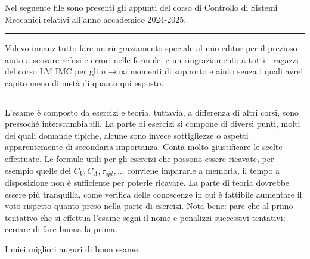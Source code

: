 \intro
Nel seguente file sono presenti gli appunti del corso di Controllo di Sistemi Meccanici relativi all'anno accademico 2024-2025.

\bigskip
\rule{\linewidth}{0.4pt}
\bigskip

Volevo innanzitutto fare un ringraziamento speciale al mio editor per il prezioso aiuto a scovare refusi e errori nelle formule, e un ringraziamento a tutti i ragazzi del corso LM IMC per gli \(n\rightarrow \infty\) momenti di supporto e aiuto senza i quali avrei capito meno di metà di quanto qui esposto.

\bigskip
\rule{\linewidth}{0.4pt}
\bigskip

L'esame è composto da esercizi e teoria, tuttavia, a differenza di altri corsi, sono pressoché interscambiabili.
La parte di esercizi si compone di diversi punti, molti dei quali domande tipiche, alcune sono invece sottigliezze o aspetti apparentemente di secondaria importanza. Conta molto giustificare le scelte effettuate.
Le formule utili per gli esercizi che possono essere ricavate, per esempio quelle dei \(C_V,C_A,\tau_{opt},\dots\) conviene impararle a memoria, il tempo a disposizione non è sufficiente per poterle ricavare.
La parte di teoria dovrebbe essere più tranquilla, come verifica delle conoscenze in cui è fattibile aumentare il voto rispetto quanto preso nella parte di esercizi.
Nota bene: pare che al primo tentativo che si effettua l'esame segni il nome e penalizzi successivi tentativi; cercare di fare buona la prima.

\vspace{5pt}

I miei migliori auguri di buon esame.